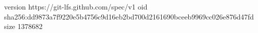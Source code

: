 version https://git-lfs.github.com/spec/v1
oid sha256:dd9873a7f9220e5b4756c9d16eb2bd700d2161690bceeb9969cc026e876d47fd
size 1378682
